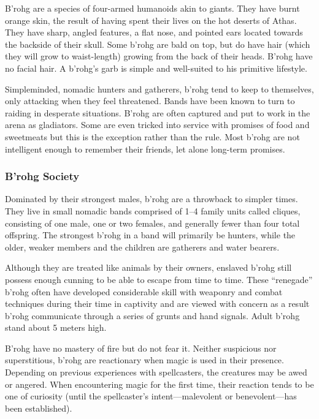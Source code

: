 B'rohg are a species of four-armed humanoids akin to giants. They have burnt orange skin, the result of having spent their lives on the hot deserts of Athas. They have sharp, angled features, a flat nose, and pointed ears located towards the backside of their skull. Some b'rohg are bald on top, but do have hair (which they will grow to waist-length) growing from the back of their heads. B'rohg have no facial hair. A b'rohg's garb is simple and well-suited to his primitive lifestyle.

Simpleminded, nomadic hunters and gatherers, b'rohg tend to keep to themselves, only attacking when they feel threatened. Bands have been known to turn to raiding in desperate situations. B'rohg are often captured and put to work in the arena as gladiators. Some are even tricked into service with promises of food and sweetmeats but this is the exception rather than the rule. Most b'rohg are not intelligent enough to remember their friends, let alone long-term promises.

\subsubsection{B'rohg Society}
Dominated by their strongest males, b'rohg are a throwback to simpler times. They live in small nomadic bands comprised of 1--4 family units called cliques, consisting of one male, one or two females, and generally fewer than four total offspring. The strongest b'rohg in a band will primarily be hunters, while the older, weaker members and the children are gatherers and water bearers.

Although they are treated like animals by their owners, enslaved b'rohg still possess enough cunning to be able to escape from time to time. These ``renegade'' b'rohg often have developed considerable skill with weaponry and combat techniques during their time in captivity and are viewed with concern as a result b'rohg communicate through a series of grunts and hand signals. Adult b'rohg stand about 5 meters high.


B'rohg have no mastery of fire but do not fear it. Neither suspicious nor superstitious, b'rohg are reactionary when magic is used in their presence. Depending on previous experiences with spellcasters, the creatures may be awed or angered. When encountering magic for the first time, their reaction tends to be one of curiosity (until the spellcaster's intent---malevolent or benevolent---has been established).

